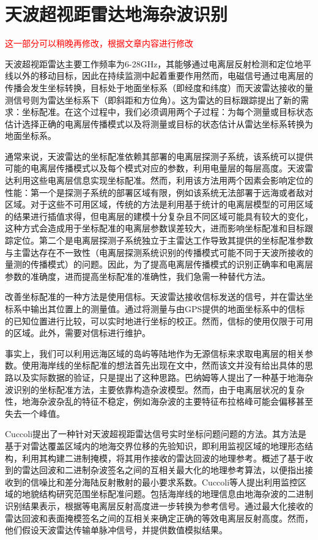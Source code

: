 \section{天波超视距雷达地海杂波识别}
\textcolor{red}{这一部分可以稍晚再修改，根据文章内容进行修改}

天波超视距雷达主要工作频率为6-28GHz，其能够通过电离层反射检测和定位地平线以外的移动目标，因此在持续监测中起着重要作用\cite{headrick1974over, fabrizio2013high}然而，电磁信号通过电离层的传播会发生坐标转换，目标处于地面坐标系（即经度和纬度）而天波雷达接收的量测信号则为雷达坐标系下（即斜距和方位角）\cite{krolik1997maximum}。这为雷达的目标跟踪提出了新的需求：坐标配准。在这个过程中，我们必须调用两个子过程：为每个测量或目标状态估计选择正确的电离层传播模式以及将测量或目标的状态估计从雷达坐标系转换为地面坐标系。

通常来说，天波雷达的坐标配准依赖其部署的电离层探测子系统，该系统可以提供可能的电离层传播模式以及每个模式对应的参数，利用电量层的每层高度\cite{wheadon1994ionospheric}。天波雷达利用这些电离层信息实现坐标配准。然而，利用该方法用两个因素会影响定位的性能：第一个是探测子系统的部署区域有限，例如该系统无法部署于远海或者敌对区域。对于这些不可用区域，传统的方法是利用基于统计的电离层模型的可用区域的结果进行插值求得，但电离层的建模十分复杂且不同区域可能具有较大的变化，这种方式会造成用于坐标配准的电离层参数误差较大，进而影响坐标配准和目标跟踪定位。第二个是电离层探测子系统独立于主雷达工作导致其提供的坐标配准参数与主雷达存在不一致性（电离层探测系统识别的传播模式可能不同于天波所接收的量测的传播模式）的问题。因此，为了提高电离层传播模式的识别正确率和电离层参数的准确度，进而提高坐标配准的准确性，我们急需一种替代方法。

改善坐标配准的一种方法是使用信标\cite{weijers1995oth}。天波雷达接收信标发送的信号，并在雷达坐标系中输出其位置上的测量值。通过将测量与由GPS提供的地面坐标系中的信标的已知位置进行比较，可以实时地进行坐标的校正。然而，信标的使用仅限于可用的区域。此外，需要对信标进行维护。

事实上，我们可以利用远海区域的岛屿等陆地作为无源信标来求取电离层的相关参数。使用海岸线的坐标配准的想法首先出现在文\cite{wheadon1994ionospheric}中，然而该文并没有给出具体的思路以及实际数据的验证，只是提出了这种思路。巴纳姆等人\cite{barnum1998over}提出了一种基于地海杂波识别的坐标配准方法，主要依靠构造杂波模型。然而，由于电离层状况的复杂性，地海杂波杂乱的特征不稳定，例如海杂波的主要特征布拉格峰可能会偏移甚至失去一个峰值。

Cuccoli\cite{cuccoli2009over, cuccoli2009over2, cuccoli2010sea, cuccoli2011coordinate}提出了一种针对天波超视距雷达信号实时坐标问题问题的方法。其方法是基于对雷达覆盖区域内的地海交界位移的先验知识，即利用监视区域的地理形态结构，利用其构建二进制掩模，将其用作接收的雷达回波的地理参考。概述了基于收到的雷达回波和二进制杂波签名之间的互相关最大化的地理参考算法，以便指出接收到的信噪比和差分海陆反射散射的最小要求系数。Cuccoli\cite{cuccoli2011coordinate}等人提出利用监控区域的地貌结构研究范围坐标配准问题。包括海岸线的地理信息由地海杂波的二进制识别结果表示，根据等电离层反射高度进一步转换为参考信号。通过最大化接收的雷达回波和表面掩模签名之间的互相关来确定正确的等效电离层反射高度。然而，他们假设天波雷达传输单脉冲信号，并提供数值模拟结果。

